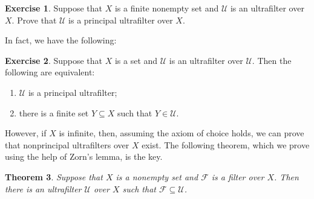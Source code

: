 \documentclass[a4paper]{memoir}
\newtheorem{theorem}{Theorem}[section]
\theoremstyle{definition}
\newtheorem{exercise}[theorem]{Exercise}
\newcommand{\mc}{\mathcal}
\begin{document}
\begin{exercise}
  Suppose that $X$ is a finite nonempty set and $\mathcal{U}$ is an ultrafilter over $X$. 
  Prove that $\mathcal{U}$ is a principal ultrafilter over $X$.
\end{exercise}

In fact, we have the following:

\begin{exercise}
  Suppose that $X$ is a set and $\mc{U}$ is an ultrafilter over $\mc{U}$. Then the following 
  are equivalent:
  \begin{enumerate}
    \item $\mc{U}$ is a principal ultrafilter;
    \item there is a finite set $Y \subseteq X$ such that $Y \in \mc{U}$.
  \end{enumerate}
\end{exercise}

However, if $X$ is infinite, then, assuming the axiom of choice holds, we can prove that 
nonprincipal ultrafilters over $X$ exist. The following theorem, which we prove using the help 
of Zorn's lemma, is the key.

\begin{theorem} \label{thm: ultrafilter_extension}
  Suppose that $X$ is a nonempty set and $\mathcal{F}$ is a filter over $X$. Then there 
  is an ultrafilter $\mathcal{U}$ over $X$ such that $\mathcal{F} \subseteq \mathcal{U}$.
\end{theorem}
\end{document}

